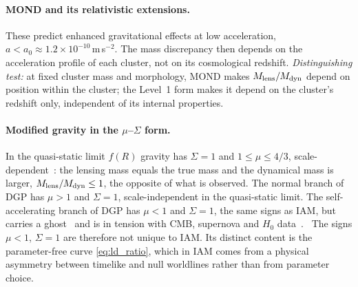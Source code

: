 \paragraph{MOND and its relativistic extensions.} These predict enhanced gravitational effects at low acceleration, $a<a_0\approx1.2\times10^{-10}$\,m\,s$^{-2}$.
The mass discrepancy then depends on the acceleration profile of each cluster, not on its cosmological redshift. \emph{Distinguishing test:} at fixed
cluster mass and morphology, MOND makes $M_{\rm lens}/M_{\rm dyn}$ depend on position within the cluster; the Level~1 form makes it depend on the
cluster's redshift only, independent of its internal properties. \prediction

\paragraph{Modified gravity in the $\mu$--$\Sigma$ form.} In the quasi-static limit $f(R)$ gravity has $\Sigma=1$ and $1\le\mu\le4/3$, scale-dependent~\cite{PogosianSilvestri2016}: the lensing mass equals the true mass and the dynamical mass is larger, $M_{\rm lens}/M_{\rm dyn}\le1$, the opposite of
what is observed. The normal branch of DGP has $\mu>1$ and $\Sigma=1$, scale-independent in the quasi-static limit. The self-accelerating branch of
DGP has $\mu<1$ and $\Sigma=1$, the same signs as IAM, but carries a ghost~\cite{Koyama2007} and is in tension with CMB, supernova and $H_0$
data~\cite{Fang2008}. \observed\ The signs $\mu<1$, $\Sigma=1$ are therefore not unique to IAM. Its distinct content is the parameter-free curve
\eqref{eq:ld_ratio}, which in IAM comes from a physical asymmetry between timelike and null worldlines rather than from parameter
choice. \interp

